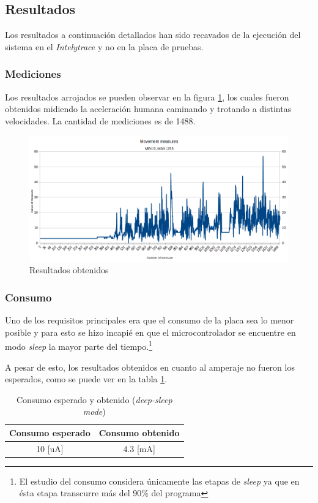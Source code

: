 \documentclass{article}
\newcommand{ \fnsleep }{\footnote{El estudio del consumo considera únicamente las etapas de \emph{sleep} ya que en ésta etapa transcurre más del 90\% del programa}}
\begin{document}
    \subsection{Resultados}
    Los resultados a continuación detallados han sido recavados de la ejecución
    del sistema en el \emph{Intelytrace} y no en la placa de pruebas.

    \subsubsection{Mediciones}
    Los resultados arrojados se pueden observar en la figura 
    \ref{fig:resultados_modulo}, los cuales fueron obtenidos midiendo la 
    aceleración humana caminando y trotando a distintas velocidades. La 
    cantidad de mediciones es de 1488.

    \begin{figure}[h]
        \includegraphics[width=1.0 \textwidth, center]{results_module.png}
        \caption{Resultados obtenidos}
        \label{fig:resultados_modulo}
    \end{figure}

    \subsubsection{Consumo}
    Uno de los requisitos principales era que el consumo de la placa sea lo 
    menor posible y para esto se hizo incapié en que el microcontrolador se 
    encuentre en modo \emph{sleep} la mayor parte del tiempo.\fnsleep \par
    A pesar de esto, los resultados obtenidos en cuanto al amperaje no fueron
    los esperados, como se puede ver en la tabla \ref{tab:consumo}.

    \begin{table}[h]
        \centering
        \begin{tabular}{||c|c||} 
            \hline
            Consumo esperado & Consumo obtenido \\ [0.5ex] 
            \hline\hline
            10 [uA] & 4.3 [mA] \\
            \hline
        \end{tabular}
        \caption{Consumo esperado y obtenido (\emph{deep-sleep mode})}
        \label{tab:consumo}
    \end{table}
\end{document}
